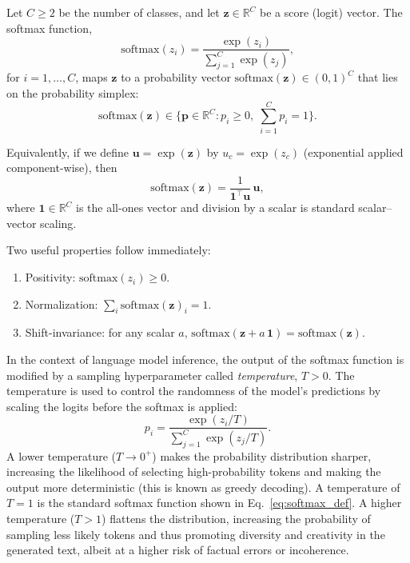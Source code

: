 \documentclass[%
  reprint,
  superscriptaddress,
  showpacs,
  showkeys,
  amsmath,amssymb,
  pra,
  longbibliography,
  floatfix,
  x11names
]{revtex4-2}
\begin{document}
Let $C\ge 2$ be the number of classes, and let $\bm{z}\in\mathbb{R}^C$ be a score (logit) vector.
The softmax function,
\begin{equation}
\mathrm{softmax}(z_i)= \frac{\exp(z_i)}{\displaystyle\sum_{j=1}^C \exp(z_j)},
\label{eq:softmax_def}
\end{equation}
for $i=1,\dots,C$,
maps $\bm{z}$ to a probability vector $\mathrm{softmax} (\bm{z}) \in(0,1)^C$ that lies on the probability simplex:
\begin{equation}
\mathrm{softmax}(\bm{z})  \in
\Big\{\bm{p}\in\mathbb{R}^C: p_i\ge 0,\; \sum_{i=1}^C p_i = 1\Big\}.
\end{equation}

Equivalently, if we define $\bm{u}=\exp(\bm{z})$ by $u_c=\exp(z_c)$ (exponential applied component-wise), then
\begin{equation}
\mathrm{softmax}(\bm{z}) = \frac{1}{\bm{1}^\intercal \bm{u}}\,\bm{u},
\end{equation}
where $\bm{1}\in\mathbb{R}^C$ is the all-ones vector and division by a scalar is standard scalar--vector scaling.

Two useful properties follow immediately:
\begin{enumerate}
    \item Positivity: $\mathrm{softmax}( {z}_i)\ge 0$.
    \item Normalization:  $\sum_i \mathrm{softmax}(\bm{z})_i=1$.
    \item Shift-invariance: for any scalar $a$, $\mathrm{softmax}(\bm{z}+a\,\bm{1})=\mathrm{softmax}(\bm{z})$.
\end{enumerate}

In the context of language model inference, the output of the softmax function is modified by a sampling hyperparameter called \emph{temperature}, $T>0$. The temperature is used to control the randomness of the model's predictions by scaling the logits before the softmax is applied:
\begin{equation}
p_i = \frac{\exp(z_i/T)}{\displaystyle\sum_{j=1}^C \exp(z_j/T)}.
\label{eq:softmax_temp}
\end{equation}
A lower temperature ($T \to 0^+$) makes the probability distribution sharper, increasing the likelihood of selecting high-probability tokens and making the output more deterministic (this is known as greedy decoding). A temperature of $T=1$ is the standard softmax function shown in Eq.~\eqref{eq:softmax_def}. A higher temperature ($T > 1$) flattens the distribution, increasing the probability of sampling less likely tokens and thus promoting diversity and creativity in the generated text, albeit at a higher risk of factual errors or incoherence.
\end{document}
